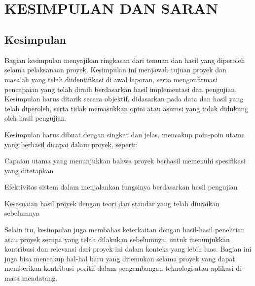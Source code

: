
\chapter[KESIMPULAN DAN SARAN]{\\ KESIMPULAN DAN SARAN}

\section{Kesimpulan}
Bagian kesimpulan menyajikan ringkasan dari temuan dan hasil yang diperoleh selama pelaksanaan proyek. Kesimpulan ini menjawab tujuan proyek dan masalah yang telah diidentifikasi di awal laporan, serta mengonfirmasi pencapaian yang telah diraih berdasarkan hasil implementasi dan pengujian. Kesimpulan harus ditarik secara objektif, didasarkan pada data dan hasil yang telah diperoleh, serta tidak memasukkan opini atau asumsi yang tidak didukung oleh hasil pengujian.

Kesimpulan harus dibuat dengan singkat dan jelas, mencakup poin-poin utama yang berhasil dicapai dalam proyek, seperti:
\begin{packed_item}
    \item Capaian utama yang menunjukkan bahwa proyek berhasil memenuhi spesifikasi yang ditetapkan
    \item Efektivitas sistem dalam menjalankan fungsinya berdasarkan hasil pengujian
    \item Kesesuaian hasil proyek dengan teori dan standar yang telah diuraikan sebelumnya
\end{packed_item}

Selain itu, kesimpulan juga membahas keterkaitan dengan hasil-hasil penelitian atau proyek serupa yang telah dilakukan sebelumnya, untuk menunjukkan kontribusi dan relevansi dari proyek ini dalam konteks yang lebih luas. Bagian ini juga bisa mencakup hal-hal baru yang ditemukan selama proyek yang dapat memberikan kontribusi positif dalam pengembangan teknologi atau aplikasi di masa mendatang.

